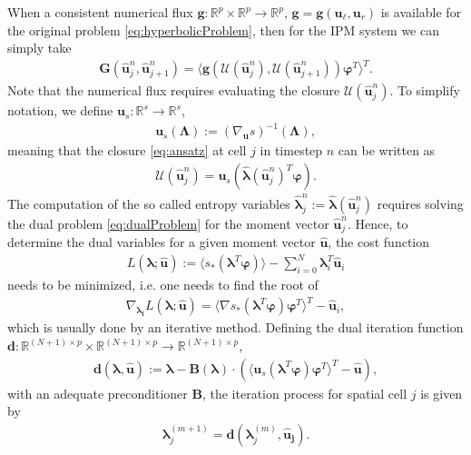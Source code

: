 When a consistent numerical flux $\bm g:\mathbb{R}^p\times\mathbb{R}^p\to\mathbb{R}^p$, $\bm g = \bm g(\bm u_\ell, \bm u_r)$ is available for the original problem \eqref{eq:hyperbolicProblem}, then for the IPM system we can simply take
\begin{align*}
 \bm{G}(\bm{\hat u}_{j}^n,\bm{\hat u}_{j+1}^{n}) = \langle \bm g(\mathcal{U}(\bm{\hat u}_j^n),\mathcal{U}(\bm{\hat u}_{j+1}^n))\bm{\varphi}^T\rangle^T.
\end{align*}
Note that the numerical flux requires evaluating the closure $\mathcal{U}(\bm{\hat u}_j^n)$. To simplify notation, we define $\bm{u}_{s}:\mathbb{R}^s \to \mathbb{R}^s$,
\begin{align*}
\bm{u}_{s}(\bm\Lambda):=\left( \nabla_{\bm{u}} s \right)^{-1}(\bm\Lambda),
\end{align*}
meaning that the closure \eqref{eq:ansatz} at cell $j$ in timestep $n$ can be written as
\begin{align*}
\mathcal{U}(\bm{\hat u}_j^n) = \bm{u}_{s}(\bm{\hat{\lambda}}(\bm{\hat u}_j^n)^T \bm{\varphi}).
\end{align*}
The computation of the so called entropy variables $\bm{\hat\lambda}_j^n:=\bm{\hat\lambda}(\bm{\hat u}_j^n)$ requires solving the dual problem \eqref{eq:dualProblem} for the moment vector $\bm{\hat u}_{j}^{n}$. Hence, to determine the dual variables for a given moment vector $\bm{\hat{u}}$, the cost function
\begin{align*}
L(\bm{\lambda};\bm{\hat{u}}) := \langle s_*(\bm{\lambda}^T \bm\varphi)\rangle - \sum_{i=0}^{N}\bm{\lambda}_i^T \bm{\hat u}_i
\end{align*}
needs to be minimized, i.e. one needs to find the root of
\begin{align*}
\nabla_{\bm{\lambda_i}}L(\bm{\lambda};\bm{\hat{u}}) = \langle \nabla s_*(\bm{\lambda}^T \bm\varphi)\bm\varphi^T\rangle^T - \bm{\hat u}_i,
\end{align*}
which is usually done by an iterative method. Defining the dual iteration function $\bm{d}:\mathbb{R}^{(N+1)\times p}\times\mathbb{R}^{(N+1)\times p}\to\mathbb{R}^{(N+1)\times p}$,
\begin{align}\label{eq:dualIterationFunction}
\bm{d}(\bm{\lambda},\bm{\hat{u}}):= \bm{\lambda}-\bm{B}(\bm{\lambda})\cdot \left(\langle \bm u_{s}(\bm{\lambda}^T\bm{\varphi})\bm{\varphi}^T\rangle^T-\bm{\hat{u}}\right),
\end{align}
with an adequate preconditioner $\bm{B}$, the iteration process for spatial cell $j$ is given by
\begin{align}\label{eq:dualIteration1}
\bm{\lambda}^{(m+1)}_j = \bm{d}(\bm{\lambda}_j^{(m)},\bm{\hat{u}_j}).
\end{align}
